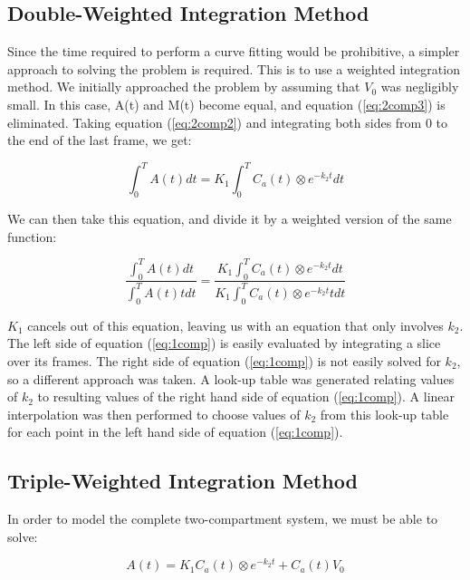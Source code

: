 \subsection{Double-Weighted Integration Method}

\label{sec:double_weight}

Since the time required to perform a curve fitting would be
prohibitive, a simpler approach to solving the problem is required.
This is to use a weighted integration method.  We initially approached
the problem by assuming that $V_{0}$ was negligibly small.  In this
case, A(t) and M(t) become equal, and equation (\ref{eq:2comp3}) is
eliminated.  Taking equation (\ref{eq:2comp2}) and integrating both
sides from 0 to the end of the last frame, we get:

\begin{equation}
\int_{0}^{T} A(t) dt = K_{1} \int_{0}^{T} C_{a}(t) \otimes e^{-k_{2}t} dt
\end{equation}

We can then take this equation, and divide it by a weighted version of
the same function:

\begin{equation}
\frac{\int_{0}^{T} A(t) dt}{\int_{0}^{T} A(t) t dt} = \frac{K_{1} \int_{0}^{T} C_{a}(t) \otimes e^{-k_{2}t} dt}{K_{1} \int_{0}^{T} C_{a}(t) \otimes e^{-k_{2}t} t dt}  \label{eq:1comp}
\end{equation}

$K_{1}$ cancels out of this equation, leaving us with an equation that
only involves $k_{2}$.  The left side of equation (\ref{eq:1comp}) is
easily evaluated by integrating a slice over its frames.  The right
side of equation (\ref{eq:1comp}) is not easily solved for $k_{2}$, so
a different approach was taken.  A look-up table was generated
relating values of $k_{2}$ to resulting values of the right hand side
of equation (\ref{eq:1comp}).  A linear interpolation was then
performed to choose values of $k_{2}$ from this look-up table for each
point in the left hand side of equation (\ref{eq:1comp}).


\subsection{Triple-Weighted Integration Method}

In order to model the complete two-compartment system, we must be able
to solve:

\begin{equation}
A(t) = K_{1}C_{a}(t) \otimes e^{-k_{2}t} + C_{a}(t)V_{0}  \label{eq:full}
\end{equation}

